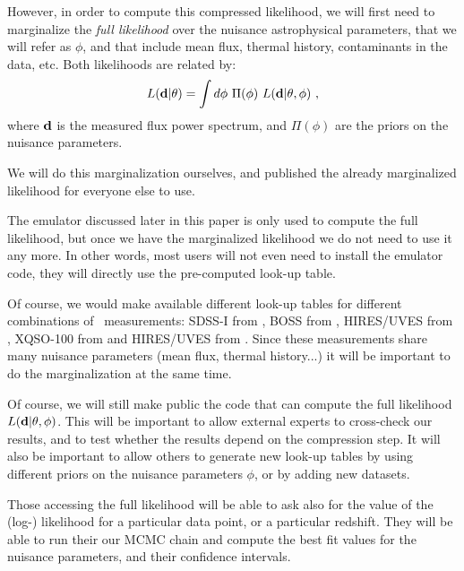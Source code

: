 However, in order to compute this compressed likelihood, we will first need
to marginalize the \textit{full likelihood} over the nuisance astrophysical
parameters, that we will refer as $\phi$, and that include mean flux,
thermal history, contaminants in the data, etc.
Both likelihoods are related by:
\begin{equation} \label{eq:marg}
 L(\mathbf{d} | \theta)
  = \int d\phi ~ \Pi(\phi) ~ L(\mathbf{d} | \theta, \phi) ~,
\end{equation}
where $\mathbf{d}$ is the measured flux power spectrum, and $\Pi(\phi)$ are the
priors on the nuisance parameters.

We will do this marginalization ourselves, and published the already
marginalized likelihood for everyone else to use.

The emulator discussed later in this paper is only used to compute the
full likelihood, but once we have the marginalized likelihood we do not
need to use it any more.
In other words, most users will not even need to install the emulator code,
they will directly use the pre-computed look-up table.

Of course, we would make available different look-up tables for different
combinations of \lya\ measurements:
SDSS-I from \cite{McDonald2006},
BOSS from \cite{Palanque-Delabrouille2013},
HIRES/UVES from \cite{Viel2013},
XQSO-100 from \cite{Irsic2017} and
HIRES/UVES from \cite{Walther2018a}.
Since these measurements share many nuisance parameters (mean flux,
thermal history...) it will be important to do the marginalization
at the same time.

Of course, we will still make public the code that can compute the full
likelihood $L(\mathbf{d} | \theta, \phi)$.
This will be important to allow external experts to cross-check our results,
and to test whether the results depend on the compression step.
It will also be important to allow others to generate new look-up tables
by using different priors on the nuisance parameters $\phi$, or by adding
new datasets.

Those accessing the full likelihood will be able to ask also for the value
of the (log-) likelihood for a particular data point, or a particular
redshift.
They will be able to run their our MCMC chain and compute the best fit 
values for the nuisance parameters, and their confidence intervals.

